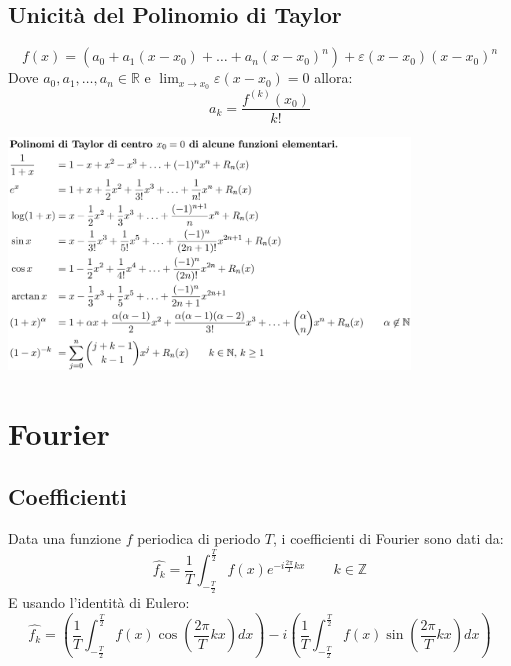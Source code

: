 \documentclass[10pt, a4paper]{article}
\begin{document}
    \subsection{Unicità del Polinomio di Taylor}
    \begin{equation*}
        f(x)=(a_0+a_1(x-x_0)+\ldots+a_n(x-x_0)^n)+\varepsilon(x-x_0)(x-x_0)^n
    \end{equation*}
    Dove $a_0,a_1,\ldots,a_n\in\mathbb{R}$ e $\lim_{x\rightarrow x_0}\varepsilon(x-x_0)=0$ allora:
    \begin{equation*}
        a_k = \frac{f^{(k)}(x_0)}{k!}
    \end{equation*}
    \begin{center}
        \includegraphics[width=0.8\textwidth]{Images/serieditaylor.png}
    \end{center}
\newpage
\section{Fourier}
    \subsection{Coefficienti}
        Data una funzione $f$ periodica di periodo $T$, i coefficienti di Fourier sono dati da:
        \begin{equation*}
            \hat{f_k}=\frac{1}{T}\int_{-\frac{T}{2}}^{\frac{T}{2}}f(x)e^{-i\frac{2\pi}{T}kx} \qquad k\in\mathbb{Z}
        \end{equation*}
        E usando l'identità di Eulero:
        \begin{equation*}
            \hat{f_k}=\left(\frac{1}{T}\int_{-\frac{T}{2}}^{\frac{T}{2}}f(x)\cos\left(\frac{2\pi}{T}kx\right)dx\right)-i\left(\frac{1}{T}\int_{-\frac{T}{2}}^{\frac{T}{2}}f(x)\sin\left(\frac{2\pi}{T}kx\right)dx\right)
        \end{equation*}
\end{document}
